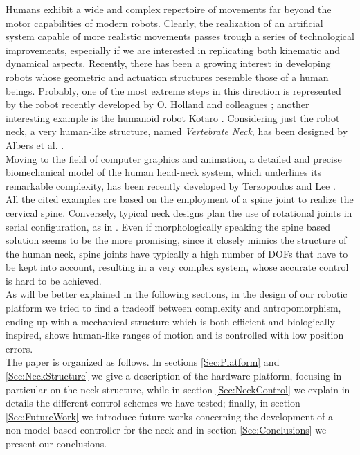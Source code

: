 \documentclass[conference]{IEEEtran}
\numberwithin{equation}{section}
\begin{document}
Humans exhibit a wide and complex repertoire of movements far beyond the motor capabilities of modern robots. Clearly, the
realization of an artificial system capable of more realistic movements passes trough a series of technological improvements,
especially if we are interested in replicating both kinematic and dynamical aspects. Recently, there has been a growing interest in developing robots whose geometric and actuation structures resemble those of a human beings. Probably, one of the most extreme steps in this direction is represented by the robot recently developed by O. Holland and colleagues \cite{Cronos}; another interesting example is the humanoid robot Kotaro \cite{Kotaro}. Considering just the robot neck, a very human-like structure, named \emph{Vertebrate Neck}, has been designed by Albers et al. \cite{Albers03humanoid}.\\Moving to the field of computer graphics and animation, a detailed and precise biomechanical model of the human head-neck system, which underlines its remarkable complexity, has been recently developed by Terzopoulos and Lee \cite{Terzopoulos06}.\\All the cited examples are based on the employment of a spine joint to realize the cervical spine. Conversely, typical neck designs plan the use of rotational joints in serial configuration, as in \cite{Kim04head,Billard05robota}. Even if morphologically speaking the spine based solution seems to be the more promising, since it closely mimics the structure of the human neck, spine joints have typically a high number of DOFs that have to be kept into account, resulting in a very complex system, whose accurate control is hard to be achieved.\\As will be better explained in the following sections, in the design of our robotic platform we tried to find a tradeoff between complexity and antropomorphism, ending up with a mechanical structure which is both efficient and biologically inspired, shows human-like ranges of motion and is controlled with low position errors.\\The paper is organized as follows. In sections \ref{Sec:Platform} and \ref{Sec:NeckStructure} we give a description of the hardware platform, focusing in particular on the neck structure, while in section \ref{Sec:NeckControl} we explain in details the different control schemes we have tested; finally, in section \ref{Sec:FutureWork} we introduce future works concerning the development of a non-model-based controller for the neck and in section \ref{Sec:Conclusions} we present our conclusions.
\end{document}
